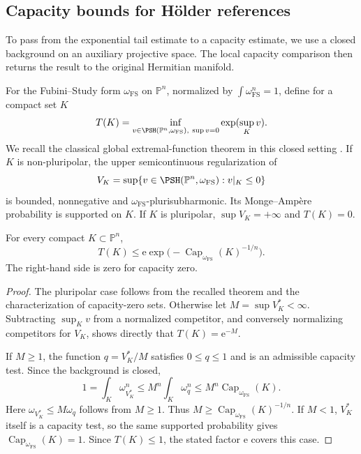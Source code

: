 \subsection{Capacity bounds for H\"older references}

To pass from the exponential tail estimate to a capacity estimate, we use a closed background on an auxiliary projective space. The local capacity comparison then returns the result to the original Hermitian manifold.

For the Fubini--Study form $\omega_{\mathrm{FS}}$ on $\mathbb P^n$, normalized by $\int\omega_{\mathrm{FS}}^n=1$, define for a compact set $K$
\[
 T(K)=\inf_{v\in\PSH(\mathbb P^n,\omega_{\mathrm{FS}}),\ \sup v=0}
                 \exp(\sup_Kv).
\]
We recall the classical global extremal-function theorem in this closed setting \cite{GZ17}. If $K$ is non-pluripolar, the upper semicontinuous regularization of
\[
 V_K=\sup\{v\in\PSH(\mathbb P^n,\omega_{\mathrm{FS}}):v|_K\leq0\}
\]
is bounded, nonnegative and $\omega_{\mathrm{FS}}$-plurisubharmonic. Its Monge--Amp\`ere probability is supported on $K$. If $K$ is pluripolar, $\sup V_K=+\infty$ and $T(K)=0$.

\begin{lemma}\label{lem:projective-capacity-comparison}
For every compact $K\subset\mathbb P^n$,
\[
 T(K)\leq\mathrm e\exp\bigl(-\operatorname{Cap}_{\omega_{\mathrm{FS}}}(K)^{-1/n}\bigr).
\]
The right-hand side is zero for capacity zero.
\end{lemma}
\begin{proof}
The pluripolar case follows from the recalled theorem and the characterization of capacity-zero sets. Otherwise let $M=\sup V_K^*<\infty$. Subtracting $\sup_Kv$ from a normalized competitor, and conversely normalizing competitors for $V_K$, shows directly that $T(K)=\mathrm e^{-M}$.

If $M\geq1$, the function $q=V_K^*/M$ satisfies $0\leq q\leq1$ and is an admissible capacity test. Since the background is closed,
\[
 1=\int_K\omega_{V_K^*}^n
 \leq M^n\int_K\omega_q^n
 \leq M^n\operatorname{Cap}_{\omega_{\mathrm{FS}}}(K).
\]
Here $\omega_{V_K^*}\leq M\omega_q$ follows from $M\geq1$. Thus $M\geq\operatorname{Cap}_{\omega_{\mathrm{FS}}}(K)^{-1/n}$. If $M<1$, $V_K^*$ itself is a capacity test, so the same supported probability gives $\operatorname{Cap}_{\omega_{\mathrm{FS}}}(K)=1$. Since $T(K)\leq1$, the stated factor $\mathrm e$ covers this case.
\end{proof}

